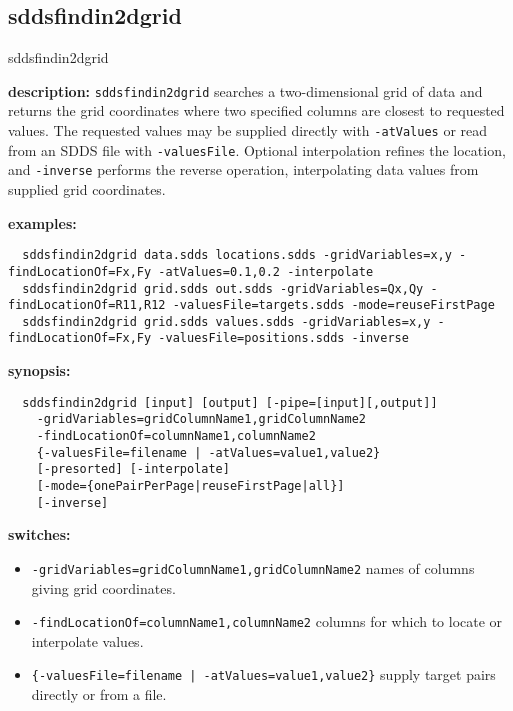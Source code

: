 \newpage
\subsection{sddsfindin2dgrid}
\label{sddsfindin2dgrid}

\begin{sddsprog}{sddsfindin2dgrid}
  \item \textbf{description:} \verb|sddsfindin2dgrid| searches a two-dimensional grid of data and returns the grid coordinates where two specified columns are closest to requested values. The requested values may be supplied directly with \verb|-atValues| or read from an SDDS file with \verb|-valuesFile|. Optional interpolation refines the location, and \verb|-inverse| performs the reverse operation, interpolating data values from supplied grid coordinates.
  \item \textbf{examples:}
  \begin{verbatim}
  sddsfindin2dgrid data.sdds locations.sdds -gridVariables=x,y -findLocationOf=Fx,Fy -atValues=0.1,0.2 -interpolate
  sddsfindin2dgrid grid.sdds out.sdds -gridVariables=Qx,Qy -findLocationOf=R11,R12 -valuesFile=targets.sdds -mode=reuseFirstPage
  sddsfindin2dgrid grid.sdds values.sdds -gridVariables=x,y -findLocationOf=Fx,Fy -valuesFile=positions.sdds -inverse
  \end{verbatim}
  \item \textbf{synopsis:}
  \begin{verbatim}
  sddsfindin2dgrid [input] [output] [-pipe=[input][,output]]
    -gridVariables=gridColumnName1,gridColumnName2
    -findLocationOf=columnName1,columnName2
    {-valuesFile=filename | -atValues=value1,value2}
    [-presorted] [-interpolate]
    [-mode={onePairPerPage|reuseFirstPage|all}]
    [-inverse]
  \end{verbatim}
  \item \textbf{switches:}
  \begin{itemize}
    \item \verb|-gridVariables=gridColumnName1,gridColumnName2| \textendash{} names of columns giving grid coordinates.
    \item \verb|-findLocationOf=columnName1,columnName2| \textendash{} columns for which to locate or interpolate values.
    \item \verb+{-valuesFile=filename | -atValues=value1,value2}+ \textendash{} supply target pairs directly or from a file.

\end{itemize}
\end{sddsprog}
